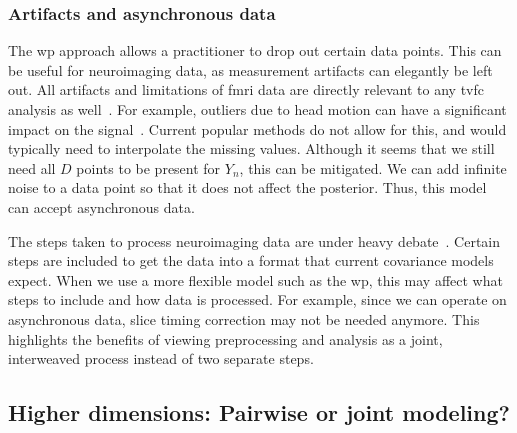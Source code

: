 \subsubsection{Artifacts and asynchronous data}

The \gls{wp} approach allows a practitioner to drop out certain data points.
This can be useful for neuroimaging data, as measurement artifacts can elegantly be left out.
All artifacts and limitations of \gls{fmri} data are directly relevant to any \gls{tvfc} analysis as well~\parencite{Nalci2019}.
For example, outliers due to head motion can have a significant impact on the signal~\parencite{Power2014, Power2015}.
Current popular methods do not allow for this, and would typically need to interpolate the missing values.
%
Although it seems that we still need all $D$ points to be present for $Y_n$, this can be mitigated.
We can add infinite noise to a data point so that it does not affect the posterior.
Thus, this model can accept asynchronous data.

The steps taken to process neuroimaging data are under heavy debate~\parencite[see e.g.][]{Poldrack2017, Botvinik-Nezer2020, Lindquist2020, Elliott2021}.
Certain steps are included to get the data into a format that current covariance models expect.
When we use a more flexible model such as the \gls{wp}, this may affect what steps to include and how data is processed.
For example, since we can operate on asynchronous data, slice timing correction may not be needed anymore.
This highlights the benefits of viewing preprocessing and analysis as a joint, interweaved process instead of two separate steps.

\subsection{Higher dimensions: Pairwise or joint modeling?}\label{subsec:higher-dimensions}

